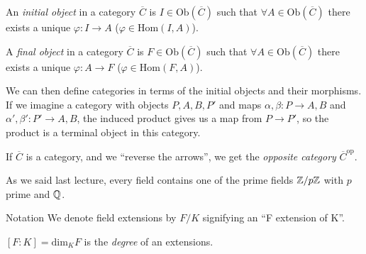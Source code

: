 \documentclass[a4paper,twoside,master.tex]{subfiles}
\begin{document}

\begin{definition}
    An \textit{initial object} in a category $ \overline{C} $ is $ I \in \text{Ob}(\overline{C}) $ such that $ \forall A \in \text{Ob}(\overline{C}) $ there exists a unique $ \varphi\colon I \to A $ ($ \varphi \in \text{Hom}(I,A) $).
\end{definition}
\begin{definition}
    A \textit{final object} in a category $ \overline{C} $ is $ F \in \text{Ob}(\overline{C}) $ such that $ \forall A \in \text{Ob}(\overline{C}) $ there exists a unique $ \varphi\colon A \to F $ ($ \varphi \in \text{Hom}(F,A) $).
\end{definition}
We can then define categories in terms of the initial objects and their morphisms. If we imagine a category with objects $ P, A, B, P' $ and maps $ \alpha, \beta \colon P \to A,B $ and $ \alpha', \beta'\colon P' \to A,B $, the induced product gives us a map from $ P \to P' $, so the product is a terminal object in this category.

\begin{definition}
    If $ \overline{C} $ is a category, and we ``reverse the arrows'', we get the \textit{opposite category} $ \overline{C}^{\text{op}} $.
\end{definition}

As we said last lecture, every field contains one of the prime fields $ \mathbb{Z}/p\mathbb{Z} $ with $ p $ prime and $ \mathbb{Q} $.

\begin{note}{Notation}
    We denote field extensions by $ F/K $ signifying an ``F extension of K''.
\end{note}

\begin{definition}
    $ [F : K] = \text{dim}_{K} F $ is the \textit{degree} of an extensions.
\end{definition}
\end{document}
